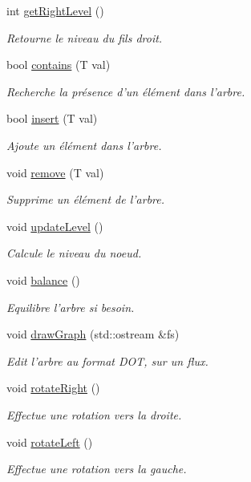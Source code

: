 \begin{DoxyCompactItemize}
int \hyperlink{class_a_v_l_aa5d2114f9ac858f584b45882acff29a4}{get\+Right\+Level} ()
\begin{DoxyCompactList}\small\item\em Retourne le niveau du fils droit. \end{DoxyCompactList}\item 
bool \hyperlink{class_a_v_l_a1d9cd2afeb001a6a4fc9f90964d66b0d}{contains} (T val)
\begin{DoxyCompactList}\small\item\em Recherche la présence d'un élément dans l'arbre. \end{DoxyCompactList}\item 
bool \hyperlink{class_a_v_l_a2d2a25555c9663fad061fdbd5d1cdb70}{insert} (T val)
\begin{DoxyCompactList}\small\item\em Ajoute un élément dans l'arbre. \end{DoxyCompactList}\item 
void \hyperlink{class_a_v_l_a56be8fad6f796381e516b02b140563ee}{remove} (T val)
\begin{DoxyCompactList}\small\item\em Supprime un élément de l'arbre. \end{DoxyCompactList}\item 
void \hyperlink{class_a_v_l_adcea8d3f61ef24eef897e3cdf4952374}{update\+Level} ()
\begin{DoxyCompactList}\small\item\em Calcule le niveau du noeud. \end{DoxyCompactList}\item 
void \hyperlink{class_a_v_l_a88990625197e11f57df2e7bcf559e8f9}{balance} ()
\begin{DoxyCompactList}\small\item\em Equilibre l'arbre si besoin. \end{DoxyCompactList}\item 
void \hyperlink{class_a_v_l_a4b62e0576e9c74e70b43348ca1d86081}{draw\+Graph} (std\+::ostream \&fs)
\begin{DoxyCompactList}\small\item\em Edit l'arbre au format D\+O\+T, sur un flux. \end{DoxyCompactList}\item 
void \hyperlink{class_a_v_l_a4785b0ae1023d3dee584ffbbc45057a3}{rotate\+Right} ()
\begin{DoxyCompactList}\small\item\em Effectue une rotation vers la droite. \end{DoxyCompactList}\item 
void \hyperlink{class_a_v_l_ac972995f3084d8876eb143916ccf8f8e}{rotate\+Left} ()
\begin{DoxyCompactList}\small\item\em Effectue une rotation vers la gauche. \end{DoxyCompactList}\end{DoxyCompactItemize}
